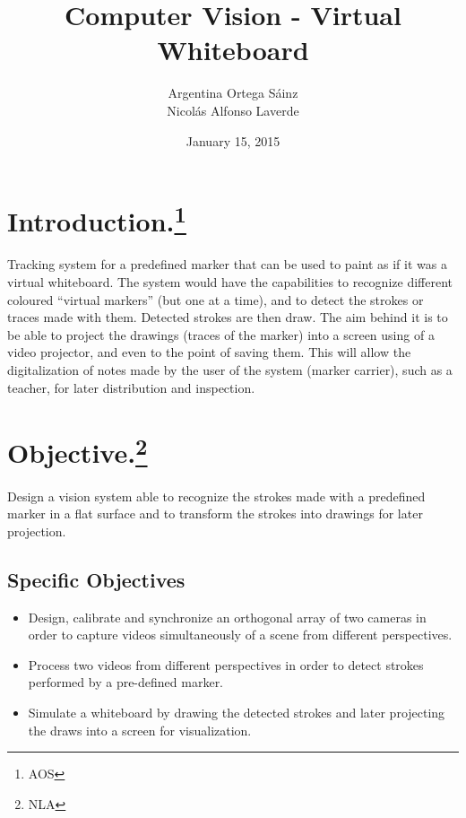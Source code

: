 \documentclass[a4paper,12pt]{article}
\title{Computer Vision - Virtual Whiteboard}
\author{Argentina Ortega Sáinz \\
        Nicolás Alfonso Laverde}
\date{January 15, 2015}
\begin{document}
\maketitle
{}







\section[Introduction]{Introduction.\footnote{AOS}}
Tracking system for a predefined marker that can be used to paint as if it was a virtual whiteboard. The system would have the capabilities to recognize different coloured “virtual markers” (but one at a time), and to detect the strokes or traces made with them. Detected strokes are then draw.
The aim behind it is to be able to project the drawings (traces of the marker) into a screen using of a video projector, and even to the point of saving them. This will allow the digitalization of notes made by the user of the system (marker carrier), such as a teacher, for later distribution and inspection.
\section[Objective]{Objective.\footnote{NLA}}
Design a vision system able to recognize the strokes made with a predefined marker in a flat surface and to transform the strokes into drawings for later projection.
\subsection{Specific Objectives}
\begin{itemize}
\item Design, calibrate and synchronize an orthogonal array of two cameras in order to capture videos simultaneously of a scene from different perspectives.
\item Process two videos from different perspectives in order to detect strokes performed by a pre-defined marker.
\item Simulate a whiteboard by drawing the detected strokes and later projecting the draws into a screen for visualization.
\end{itemize}
\end{document}
